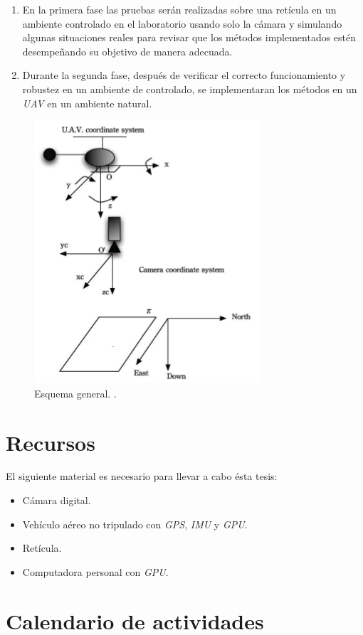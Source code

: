 \documentclass[12pt,letterpaper]{article}
\newlength{\spacing}
\newcommand{\nspace}[1]{\setlength{\baselineskip}{#1\spacing}}
\newenvironment{linespacing}[1]{\nspace{#1}}{}
\begin{document}
\begin{linespacing}{1.5}
\begin{enumerate}
\item En la primera fase las pruebas serán realizadas sobre una retícula en un ambiente controlado en el laboratorio usando solo la cámara y simulando algunas situaciones reales para revisar que los métodos implementados estén desempeñando su objetivo de manera adecuada.
\item Durante la segunda fase, después de verificar el correcto funcionamiento y robustez en un ambiente de controlado, se implementaran los métodos en un \textit{UAV} en un ambiente natural.
\end{enumerate}

\begin{figure}[H]
\centering
\includegraphics[width=.55\linewidth]{metodologia.png}
\caption{Esquema general. \cite{Martinez2011}.}
\end{figure}

\section{Recursos}
El siguiente material es necesario para llevar a cabo ésta tesis:

\begin{itemize}
\item Cámara digital.
\item Vehículo aéreo no tripulado con \textit{GPS}, \textit{IMU} y \textit{GPU}.
\item Retícula.
\item Computadora personal con \textit{GPU}.
\end{itemize}

\section{Calendario de actividades}


\end{linespacing}
\end{document}
